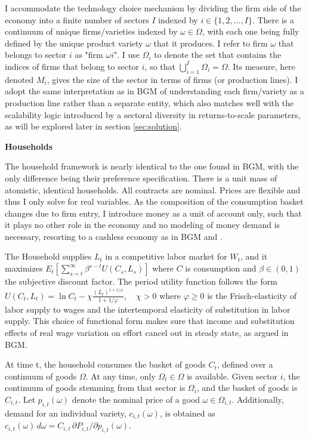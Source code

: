 \documentclass[a4paper,12pt]{article} %
\numberwithin{equation}{section} %
\numberwithin{figure}{section}
\numberwithin{table}{section}
\begin{document}
I accommodate the technology choice mechanism by dividing the firm side of the economy into a finite number of sectors $I$ indexed by
$i \in \{1,2,...,I\}$. There is a continuum of unique firms/varieties indexed by $\omega \in \Omega$, with each one being fully defined by 
the unique product variety $\omega$ that it produces. I refer to firm $\omega$ that belongs to sector $i$ as "firm $\omega i$". 
I use $\Omega_i$ to denote the set that contains the indices of firms that belong to sector $i$, so that $\bigcup_{i=1}^{I} \Omega_i = \Omega$. 
Its measure, here denoted $M_{i}$, gives the size of the sector in terms of firms (or production lines). I adopt the same interpretation as in BGM 
of understanding each firm/variety as a production line rather than a separate entity, which also matches well with the scalability logic introduced
by a sectoral diversity in returns-to-scale parameters, as will be explored later in section \ref{sec:solution}.

\medskip
\medskip
\noindent\textbf{Households}
\medskip

The household framework is nearly identical to the one found in BGM, with the only difference being their preference specification. There is a 
unit mass of atomistic, identical households. All contracts are nominal. Prices are flexible and thus I only solve for real variables. As the
composition of the consumption basket changes due to firm entry, I introduce money as a unit of account only, such that it plays no other role in the
economy and no modeling of money demand is necessary, resorting to a cashless economy as in BGM and \textcite{woodford2003interest}.

The Household supplies $L_t$ in a competitive labor market for $W_t$, and it maximizes $E_t \left[ \sum_{s=t}^{\infty} \beta^{s - t} U(C_s, L_s) \right]$ 
where $C$ is consumption and $\beta \in (0,1)$ the subjective discount factor. The period utility function follows the form 
$U(C_t, L_t) = \ln C_t - \chi \frac{(L_t)^{1 + 1/\varphi}}{1 + 1/\varphi}, \quad \chi > 0$ where $\varphi \geq 0$ is the Frisch-elasticity
of labor supply to wages and the intertemporal elasticity of substitution in labor supply. This choice of functional form makes sure that 
income and substitution effects of real wage variation on effort cancel out in steady state, as argued in BGM.

At time t, the household consumes the basket of goods $C_t$, defined over a continuum of goods $\Omega$. At any time, only $\Omega_t \in \Omega$ 
is available. Given sector $i$, the continuum of goods stemming from that sector is $\Omega_{i}$, and the basket of goods is $C_{i,t}$. 
Let $p_{i,t}(\omega)$ denote the nominal price 
of a good $\omega \in \Omega_{i,t}$. Additionally, demand for an individual variety, $c_{i,t}(\omega)$, is obtained as 
$c_{i,t}(\omega) \, d\omega = C_{i,t} \, \partial P_{i,t} / \partial p_{i,t}(\omega)$.
\end{document}
